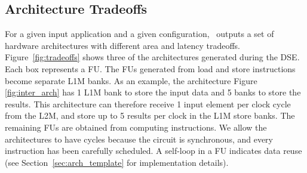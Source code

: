 \subsection{Architecture Tradeoffs}
\label{ssec:arch_tradeoffs}
\vspace{-1mm}
For a given input application and a given configuration, \frameworkname~outputs a set of hardware architectures with different area and latency tradeoffs. Figure~\ref{fig:tradeoffs} shows three of the architectures generated during the DSE. Each box represents a FU. The FUs generated from load and store instructions become separate L1M banks. As an example, the architecture Figure \ref{fig:inter_arch} has 1 L1M bank to store the input data and 5 banks to store the results. This architecture can therefore receive 1 input element per clock cycle from the L2M, and store up to 5 results per clock in the L1M store banks. The remaining FUs are obtained from computing instructions. We allow the architectures to have cycles because the circuit is synchronous, and every instruction has been carefully scheduled. A self-loop in a FU indicates data reuse (see Section~\ref{sec:arch_template} for implementation details).
